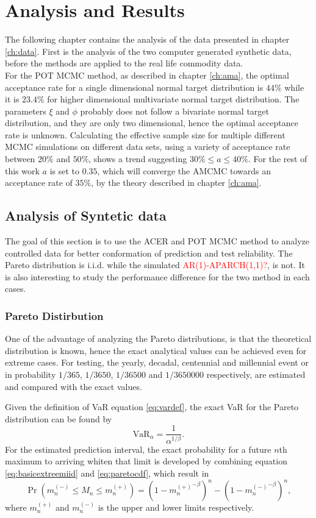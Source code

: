 \chapter[Analysis and Results]{Analysis and Results}
\label{ch:result}
The following chapter contains the analysis of the data presented in chapter \ref{ch:data}. First is the analysis of the two computer generated synthetic data, before the methods are applied to the real life commodity data.\\

For the POT MCMC method, as described in chapter \ref{ch:ama}, the optimal acceptance rate for a single dimensional normal target distribution is $44\%$ while it is $23.4\%$ for higher dimensional multivariate normal target distribution. The parameters $\xi$ and $\phi$ probably does not follow a bivariate normal target distribution, and they are only two dimensional, hence the optimal acceptance rate is unknown. Calculating the effective sample size for multiple different MCMC simulations on different data sets, using a variety of acceptance rate between $20\%$ and $50\%$, shows a trend suggesting $30\% \leq a \leq40\%$. For the rest of this work $a$ is set to $0.35$, which will converge the AMCMC towards an acceptance rate of $35\%$, by the theory described in chapter \ref{ch:ama}.

\section{Analysis of Syntetic data}
The goal of this section is to use the ACER and POT MCMC method to analyze controlled data for better conformation of prediction and test reliability. The Pareto distribution is i.i.d. while the simulated \textcolor{red}{AR(1)-APARCH(1,1)?}, is not. It is also interesting to study the performance difference for the two method in each cases.
\subsection{Pareto Distirbution}
One of the advantage of analyzing the Pareto distributions, is that the theoretical distribution is known, hence the exact analytical values can be achieved even for extreme cases. For testing, the yearly, decadal, centennial and millennial event or in probability $1/365$, $1/3650$, $1/36500$ and $1/3650000$ respectively, are estimated and compared with the exact values.

Given the definition of VaR equation \eqref{eq:vardef}, the exact VaR for the Pareto distribution can be found by 
\begin{equation*}
\text{VaR}_\alpha=\frac{1}{\alpha^{1/\beta}}.
\end{equation*} 
For the estimated prediction interval, the exact probability for a future $n$th maximum to arriving whiten that limit is developed by combining equation \eqref{eq:basicextreemiid} and \eqref{eq:paretocdf}, which result in \begin{equation*}
\Pr \left( m_n^{(-)} \leq M_n \leq m_n^{(+)} \right)=\left( 1-{ m_n^{(+)}}^{-\beta} \right)^n - \left( 1-{ m_n^{(-)}}^{-\beta} \right)^n,
\end{equation*}
where $m_n^{(+)}$ and $m_n^{(-)}$ is the upper and lower limits respectively.

